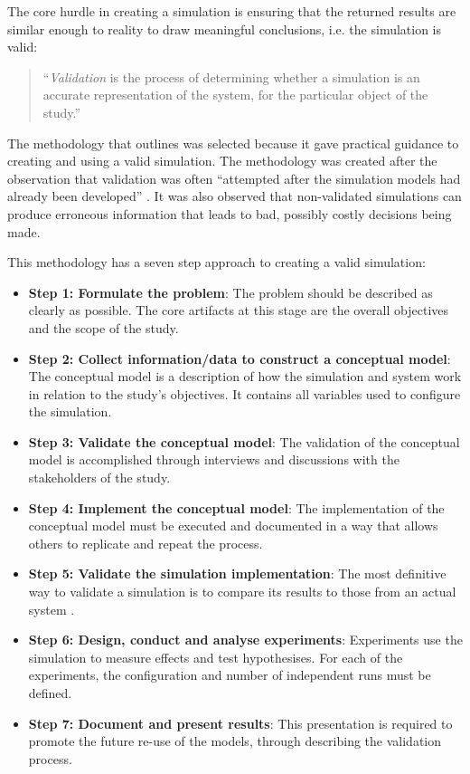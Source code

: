 The core hurdle in creating a simulation is ensuring that the returned results are similar enough to reality to draw meaningful conclusions, i.e. the simulation is valid:
\begin{quotation}
``\textit{Validation} is the process of determining whether a simulation is an accurate representation of the system, for the particular object of the study.'' \citep{Law2005}
\end{quotation}

The methodology that \cite{Law2005} outlines was selected because it gave practical guidance to creating and using a valid simulation.
The methodology was created after the observation that validation was often ``attempted after the simulation models had already been developed'' \citep{Law2005}.
It was also observed that non-validated simulations can produce erroneous information that leads to bad, possibly costly decisions being made.

This methodology has a seven step approach to creating a valid simulation:
\begin{itemize}
  \item \textbf{Step 1: Formulate the problem}: %
	The problem should be described as clearly as possible.
	The core artifacts at this stage are the overall objectives and the scope of the study.
\item \textbf{Step 2: Collect information/data to construct a conceptual model}: %
	The conceptual model is a description of how the simulation and system work in relation to the study's objectives.
	It contains all variables used to configure the simulation. 
\item \textbf{Step 3: Validate the conceptual model}: %
	The validation of the conceptual model is accomplished through interviews and discussions with the stakeholders of the study.
\item \textbf {Step 4: Implement the conceptual model}: %
	The implementation of the conceptual model must be executed and documented in a way that allows others to replicate and repeat the process.
\item \textbf{Step 5: Validate the simulation implementation}: %
	The most definitive way to validate a simulation is to compare its results to those from an actual system \citep{Law2005}.
\item \textbf{Step 6: Design, conduct and analyse experiments}:
	Experiments use the simulation to measure effects and test hypothesises. 
	For each of the experiments, the configuration and number of independent runs must be defined.
\item \textbf{Step 7: Document and present results}:
	This presentation is required to promote the future re-use of the models, through describing the validation process.
\end{itemize}

